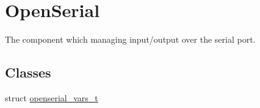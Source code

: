 \hypertarget{group___open_serial}{}\section{Open\+Serial}
\label{group___open_serial}


The component which managing input/output over the serial port.  


\subsection*{Classes}
\begin{DoxyCompactItemize}
\item 
struct \hyperlink{structopenserial__vars__t}{openserial\+\_\+vars\+\_\+t}
\end{DoxyCompactItemize}
